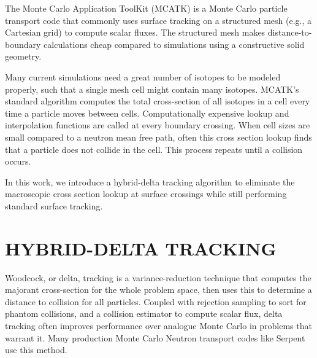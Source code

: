The Monte Carlo Application ToolKit (MCATK) \cite{mcatk} is a Monte Carlo particle transport code that commonly uses surface tracking on a structured mesh (e.g., a Cartesian grid) to compute scalar fluxes.
The structured mesh makes distance-to-boundary calculations cheap compared to simulations using a constructive solid geometry.

Many current simulations need a great number of isotopes to be modeled properly, such that a single mesh cell might contain many isotopes. 
MCATK's standard algorithm computes the total cross-section of all isotopes in a cell every time a particle moves between cells.
Computationally expensive lookup and interpolation functions are called at every boundary crossing.
When cell sizes are small compared to a neutron mean free path, often this cross section lookup finds that a particle does not collide in the cell.
This process repeats until a collision occurs.

In this work, we introduce a hybrid-delta tracking algorithm to eliminate the macroscopic cross section lookup at surface crossings while still performing standard surface tracking.

\section{HYBRID-DELTA TRACKING}
\label{sec:mcatkmethod}

Woodcock, or delta, tracking \cite{woodcock_techniques_1965} is a variance-reduction technique that computes the majorant cross-section for the whole problem space, then uses this to determine a distance to collision for all particles.
Coupled with rejection sampling to sort for phantom collisions, and a collision estimator to compute scalar flux, delta tracking often improves performance over analogue Monte Carlo in problems that warrant it.
Many production Monte Carlo Neutron transport codes like Serpent \cite{Serpent2013} use this method.

